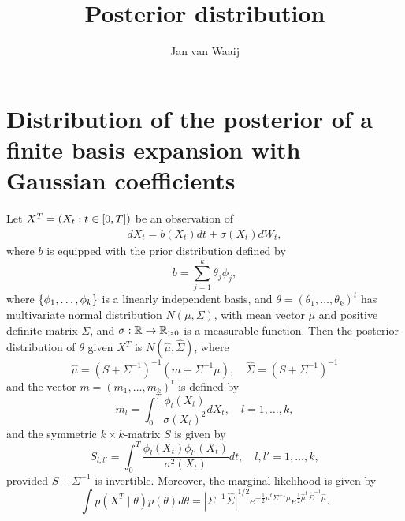 \documentclass[12pt]{article}
\title{Posterior distribution}
\author{Jan van Waaij}
\begin{document}
\section{Distribution of the posterior of a finite basis expansion with Gaussian coefficients}

\begin{lemma}\label{lem:posteriordistribution}
	Let \(X^T=\left(X_t:t\in[0,T]\right)\) be an observation of 
	\begin{align*}
		dX_t=b(X_t)dt+\sigma(X_t)dW_t,
	\end{align*}
	where \(b\) is equipped with the prior distribution defined by 
	\[
	b=\sum_{j=1}^k\theta_j\phi_j,
	\]
	where \(\left\{ \phi_1,\ldots,\phi_k \right\}\) is a linearly independent basis, and \(\theta=(\theta_1,\ldots,\theta_k)^t\) has multivariate normal distribution \(N(\mu,\Sigma)\), with mean vector $\mu$ and positive definite matrix $\Sigma$, and \(\sigma:\operatorname{\mathbb{R}}\to \operatorname{\mathbb{R}}_{>0}\) is a  measurable function. Then the  posterior distribution of \(\theta\) given $X^T$ is \(N(\hat\mu,\hat\Sigma)\), where \[\hat\mu=(S+\Sigma^{-1})^{-1}(m+\Sigma^{-1}\mu),\quad\hat\Sigma= (S+\Sigma^{-1})^{-1}\] and the vector \(m=(m_1,\ldots,m_k)^t\) is defined by 
	\[
	m_l=\int_0^T\frac{\phi_l(X_t)}{\sigma(X_t)^2}dX_t, \quad l=1,\ldots,k,
	\] 
	and the symmetric \(k\times k\)-matrix \(S\) is given by 
	\begin{equation}\label{eq:girsanovmatrix}
	S_{l,l'}=\int_0^T\frac{\phi_l(X_t)\phi_{l'}(X_t)}{\sigma^2(X_t)}dt,\quad l,l'=1,\ldots,k,
	\end{equation}
	provided \(S+\Sigma^{-1}\) is invertible. 
	Moreover, the marginal likelihood is given by 
	\[
\int p(X^T\mid \theta)p(\theta)d\theta=	|\Sigma^{-1}\hat\Sigma|^{1/2}e^{-\frac12\mu^t\Sigma^{-1}\mu} e^{\frac12\hat\mu^t\hat\Sigma^{-1}\hat\mu}.
	\]
	
\end{lemma}
\end{document}
